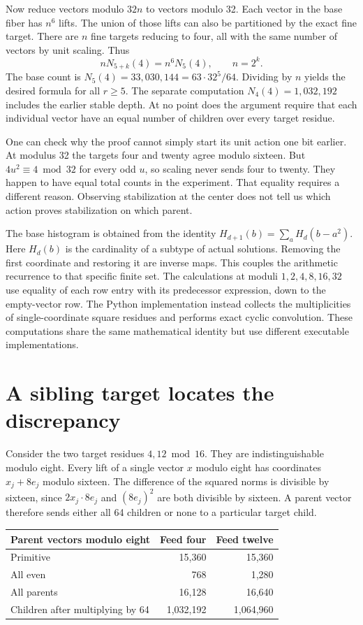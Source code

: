 \documentclass[12pt,letterpaper]{article}
\begin{document}
Now reduce vectors modulo $32n$ to vectors modulo 32. Each vector in the base fiber has $n^6$ lifts. The union of those lifts can also be partitioned by the exact fine target. There are $n$ fine targets reducing to four, all with the same number of vectors by unit scaling. Thus
\[
 nN_{5+k}(4)=n^6N_5(4),\qquad n=2^k.
\]
The base count is $N_5(4)=33,030,144=63\cdot32^5/64$. Dividing by $n$ yields the desired formula for all $r\ge5$. The separate computation $N_4(4)=1,032,192$ includes the earlier stable depth. At no point does the argument require that each individual vector have an equal number of children over every target residue.

One can check why the proof cannot simply start its unit action one bit earlier. At modulus 32 the targets four and twenty agree modulo sixteen. But $4u^2\equiv4\bmod32$ for every odd $u$, so scaling never sends four to twenty. They happen to have equal total counts in the experiment. That equality requires a different reason. Observing stabilization at the center does not tell us which action proves stabilization on which parent.

The base histogram is obtained from the identity $H_{d+1}(b)=\sum_aH_d(b-a^2)$. Here $H_d(b)$ is the cardinality of a subtype of actual solutions. Removing the first coordinate and restoring it are inverse maps. This couples the arithmetic recurrence to that specific finite set. The calculations at moduli $1,2,4,8,16,32$ use equality of each row entry with its predecessor expression, down to the empty-vector row. The Python implementation instead collects the multiplicities of single-coordinate square residues and performs exact cyclic convolution. These computations share the same mathematical identity but use different executable implementations.

\section{A sibling target locates the discrepancy}
Consider the two target residues $4,12\bmod16$. They are indistinguishable modulo eight. Every lift of a single vector $x$ modulo eight has coordinates $x_j+8e_j$ modulo sixteen. The difference of the squared norms is divisible by sixteen, since $2x_j\cdot8e_j$ and $(8e_j)^2$ are both divisible by sixteen. A parent vector therefore sends either all 64 children or none to a particular target child.

\begin{center}\begin{tabular}{lrr}\toprule
Parent vectors modulo eight & Feed four & Feed twelve\\\midrule
Primitive & 15,360&15,360\\
All even & 768&1,280\\\midrule
All parents & 16,128&16,640\\
Children after multiplying by 64 &1,032,192&1,064,960\\\bottomrule
\end{tabular}\end{center}
\end{document}
